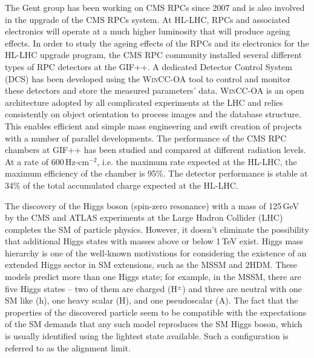The Gent group has been working on CMS RPCs since 2007 and is also involved in the upgrade of the CMS RPCs system. At HL-LHC, RPCs and associated electronics will operate at a much higher luminosity that will produce ageing effects. In order to study the ageing effects of the RPCs and its electronics for the HL-LHC upgrade program, the CMS RPC community installed several different types of RPC detectors at the GIF++. A dedicated Detector Control System (DCS) has been developed using the \textsc{WinCC-OA} tool to control and monitor these detectors and store the measured parameters’ data. \textsc{WinCC-OA} is an open architecture adopted by all complicated experiments at the LHC and relies consistently on object orientation to process images and the database structure. This enables efficient and simple mass engineering and swift creation of projects with a number of parallel developments. The performance of the CMS RPC chambers at GIF++ has been studied and compared at different radiation levels. At a rate of 600\,Hz-cm$^{-2}$, i.e. the maximum rate expected at the HL-LHC, the maximum efficiency of the chamber is 95\%. The detector performance is stable at 34\% of the total accumulated charge expected at the HL-LHC.

The discovery of the Higgs boson (spin-zero resonance) with a mass of 125\,GeV by the CMS and ATLAS experiments at the Large Hadron Collider (LHC) completes the SM of particle physics. However, it doesn't eliminate the possibility that additional Higgs states with masses above or below 1\,TeV exist.  
Higgs mass hierarchy is one of the well-known motivations for considering the existence of an extended Higgs sector in SM extensions, such as the MSSM and 2HDM.
These models predict more than one Higgs state; for example, in the MSSM, there are five Higgs states – two of them are charged (H$^{\pm}$) and three are neutral with one SM like (h), one heavy scalar (H), and one pseudoscalar (A). The fact that the properties of the discovered particle seem to be compatible with the expectations of the SM demands that any such model reproduces the SM Higgs boson, which is usually identified using the lightest state available. Such a configuration is referred to as the alignment limit.

